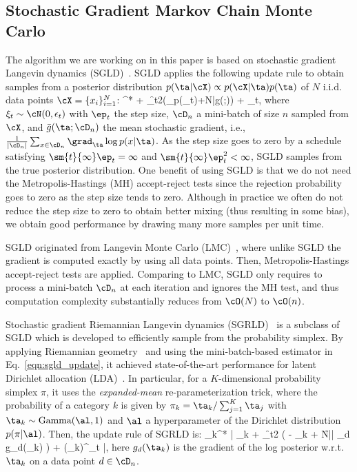 \subsection{Stochastic Gradient Markov Chain Monte Carlo}
The algorithm we are working on in this paper is based on stochastic gradient Langevin dynamics (SGLD)~\cite{welling2011bayesian}. SGLD applies the following update rule to obtain samples from a posterior distribution $p(\ta|\cX) \propto p(\cX|\ta) p(\ta)$ of $N$ i.i.d. data points $\cX=\{x_i\}_{i=1}^{N}$:
\bea
\ta^* \law \ta + \f{\epsilon_t}{2}\left(\nabla_{\ta}\log p(\ta_t)+N\bar{g}(\ta;\SGLDMinibatch)\right) + \xi_t, \label{eqn:sgld_update}
\eea
where $\xi_t \sim \cN(0,\epsilon_t )$ with $\ep_t$ the step size, $\SGLDMinibatch$ a mini-batch of size $n$ sampled from $\cX$, and $\bar{g}(\ta;\SGLDMinibatch)$ the mean stochastic gradient, i.e., $\frac{1}{|\SGLDMinibatch|}\sum_{x\in \SGLDMinibatch}^{}\grad_{\ta} \log p(x|\ta)$. As the step size goes to zero by a schedule satisfying $\sm{t}{\infty}\ep_t = \infty$ and $\sm{t}{\infty}\ep_t^2 < \infty$, SGLD samples from the true posterior distribution. One benefit of using SGLD is that we do not need the Metropolis-Hastings (MH) accept-reject tests since the rejection probability goes to zero as the step size tends to zero. Although in practice we often do not reduce the step size to zero to obtain better mixing (thus resulting in some bias), we obtain good performance by drawing many more samples per unit time. 

SGLD originated from Langevin Monte Carlo (LMC)~\cite{girolami2011riemann}, where unlike SGLD the gradient is computed exactly by using all data points. Then, Metropolis-Hastings accept-reject tests are applied. Comparing to LMC, SGLD only requires to process a mini-batch $\SGLDMinibatch$ at each iteration and ignores the MH test, and thus computation complexity substantially reduces from $\cO(N)$ to $\cO(n)$.   

Stochastic gradient Riemannian Langevin dynamics (SGRLD)~\cite{patterson2013stochastic} is a subclass of SGLD which is developed to efficiently sample from the probability simplex. By applying Riemannian geometry~\cite{girolami2011riemann} and using the mini-batch-based estimator in Eq.~\ref{eqn:sgld_update}, it achieved state-of-the-art performance for latent Dirichlet allocation (LDA)~\cite{blei2003latent}. In particular, for a $K$-dimensional probability simplex $\pi$, it uses the \textit{expanded-mean} re-parameterization trick, where the probability of a category $k$ is given by $\pi_k = \ta_k / \sum_{j=1}^K \ta_j$ with $\ta_k \sim \text{Gamma}(\al,1)$ and $\al$ a hyperparameter of the Dirichlet distribution $p(\pi | \al )$. Then, the update rule of SGRLD is:
\bea
\ta_{k}^* \law \left| \ta_{k} + \f{\ep_t}{2} \left( \al - \ta_{k} + \f{N}{|\SGLDMinibatch|} \sum_{d \in \SGLDMinibatch} g_d(\ta_{k}) \right) + (\ta_{k})^\ha \xi_{t} \right|, \label{eqn:sgrld_update}
\eea
here $g_d(\ta_{k})$ is the gradient of the log posterior w.r.t. $\ta_{k}$ on a data point $d\in \SGLDMinibatch$.

